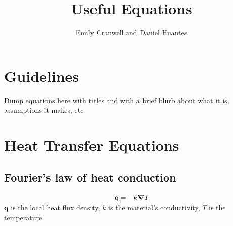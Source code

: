\documentclass[12pt]{article}
\begin{document}
\title{Useful Equations}
\author{Emily Cranwell and Daniel Huantes}
\maketitle
\section{Guidelines}
Dump equations here with titles and with a brief blurb about what it is, assumptions it makes, etc
\section{Heat Transfer Equations}
\subsection{Fourier's law of heat conduction}
\begin{equation}
\begin{aligned}
\boldsymbol{q} = -k\boldsymbol{\nabla} T
\end{aligned}
\label{fig:FLHC}
\end{equation} 
$\boldsymbol{q}$ is the local heat flux density,
$k$ is the material's conductivity,
$T$ is the temperature
\end{document}

